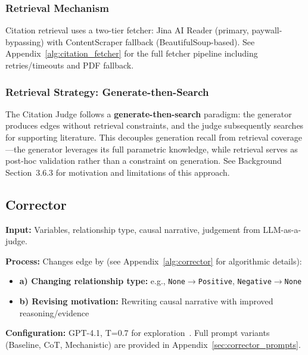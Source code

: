 \subsubsection{Retrieval Mechanism}

Citation retrieval uses a two-tier fetcher: Jina AI Reader (primary, paywall-bypassing) with ContentScraper fallback (BeautifulSoup-based). See Appendix~\ref{alg:citation_fetcher} for the full fetcher pipeline including retries/timeouts and PDF fallback.

\subsubsection{Retrieval Strategy: Generate-then-Search}
\label{sec:retrieval_strategy}

The Citation Judge follows a \textbf{generate-then-search} paradigm: the generator produces edges without retrieval constraints, and the judge subsequently searches for supporting literature. This decouples generation recall from retrieval coverage---the generator leverages its full parametric knowledge, while retrieval serves as post-hoc validation rather than a constraint on generation. See Background Section~3.6.3 for motivation and limitations of this approach.

\subsection{Corrector}
\label{sec:corrector}

\textbf{Input:} Variables, relationship type, causal narrative, judgement from LLM-as-a-judge.

\textbf{Process:} Changes edge by (see Appendix~\ref{alg:corrector} for algorithmic details):
\begin{itemize}[noitemsep]
    \item \textbf{a) Changing relationship type:} e.g., \texttt{None}$\rightarrow$\texttt{Positive}, \texttt{Negative}$\rightarrow$\texttt{None}
    \item \textbf{b) Revising motivation:} Rewriting causal narrative with improved reasoning/evidence
\end{itemize}

\textbf{Configuration:} GPT-4.1, T=0.7 for exploration~\citep{madaan2023selfrefineiterativerefinementselffeedback}. Full prompt variants (Baseline, CoT, Mechanistic) are provided in Appendix~\ref{sec:corrector_prompts}.

